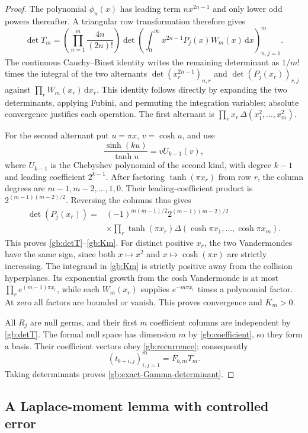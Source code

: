 \documentclass[11pt,a4paper]{article}
\numberwithin{equation}{section}
\theoremstyle{definition}
\theoremstyle{remark}
\newcommand{\dd}{\,\mathrm d}
\begin{document}
\begin{proof}
The polynomial $\phi_n(x)$ has leading term $nx^{2n-1}$ and
only lower odd powers thereafter.  A triangular row transformation
therefore gives
\[
 \det T_m=\left(\prod_{n=1}^m\frac{4n}{(2n)!}\right)
       \det\left(\int_0^\infty x^{2n-1}P_j(x)W_m(x)\dd x\right)_{n,j=1}^m.
\]
The continuous Cauchy--Binet identity writes the remaining determinant
as $1/m!$ times the integral of the two alternants
$\det(x_r^{2n-1})_{n,r}$ and $\det(P_j(x_r))_{r,j}$ against
$\prod_rW_m(x_r)\dd x_r$.  This identity follows directly by
expanding the two determinants, applying Fubini, and permuting the
integration variables; absolute convergence justifies each operation.
The first alternant is $\prod_rx_r\,\Delta(x_1^2,\ldots,x_m^2)$.

For the second alternant put $u=\pi x$, $v=\cosh u$, and use
\[
              \frac{\sinh(ku)}{\tanh u}=vU_{k-1}(v),
\]
where $U_{k-1}$ is the Chebyshev polynomial of the second kind,
with degree $k-1$ and leading coefficient $2^{k-1}$.
After factoring $\tanh(\pi x_r)$ from row $r$, the column
degrees are $m-1,m-2,\ldots,1,0$.  Their leading-coefficient
product is $2^{(m-1)(m-2)/2}$.  Reversing the columns thus gives
\[
\begin{split}
 \det(P_j(x_r))={}&(-1)^{m(m-1)/2}2^{(m-1)(m-2)/2}\\
 &\times\prod_r\tanh(\pi x_r)
              \Delta(\cosh\pi x_1,\ldots,\cosh\pi x_m).
\end{split}
\]
This proves \eqref{gb:detT}--\eqref{gb:Km}.  For distinct
positive $x_r$, the two Vandermondes have the same sign, since
both $x\mapsto x^2$ and $x\mapsto\cosh(\pi x)$ are strictly
increasing.  The integrand in \eqref{gb:Km} is strictly positive
away from the collision hyperplanes.  Its exponential growth from
the cosh Vandermonde is at most
$\prod_re^{(m-1)\pi x_r}$, while each $W_m(x_r)$ supplies
$e^{-m\pi x_r}$ times a polynomial factor.  At zero all factors
are bounded or vanish.  This proves convergence and $K_m>0$.

All $R_j$ are null germs, and their first $m$ coefficient columns
are independent by \eqref{gb:detT}.  The formal null space has
dimension $m$ by \eqref{gb:coefficient}, so they form a basis.
Their coefficient vectors obey \eqref{gb:recurrence}; consequently
\[
                  (t_{b+i,j})_{i,j=1}^m=F_{b,m}T_m.
\]
Taking determinants proves \eqref{gb:exact-Gamma-determinant}.
\end{proof}

\subsection{A Laplace-moment lemma with controlled error}
\end{document}
